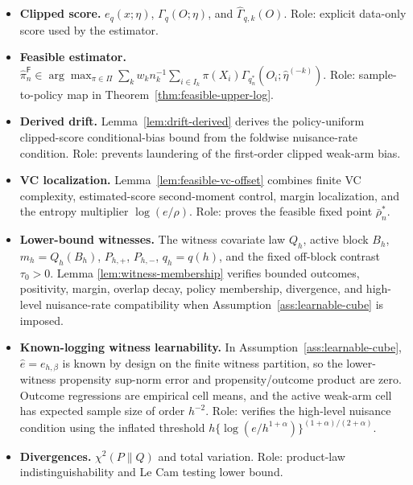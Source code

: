 \documentclass[11pt]{article}
\theoremstyle{definition}
\theoremstyle{plain}
\theoremstyle{remark}
\begin{document}
\begin{itemize}[leftmargin=*]
\(h_n^*=n^{-1/D_{\alpha,\gamma}}\),
\(q_n^*=q(h_n^*)\),
\(r_*(\alpha,\gamma)=(1+\alpha)/D_{\alpha,\gamma}\),
\(L_n^*=\log\{e/(h_n^*)^{1+\alpha}\), and
\(\bar\rho_n^*=(h_n^*)^{1+\alpha}(L_n^*)^{(1+\alpha)/(2+\alpha)}\).
Role: lower-bound calibration and finite-VC feasible upper-bound calibration.
\item \textbf{Clipped score.}  \(e_q(x;\eta)\), \(\Gamma_q(O;\eta)\), and
\(\widehat\Gamma_{q,k}(O)\).  Role: explicit data-only score used by the
estimator.
\item \textbf{Feasible estimator.}
\(\widehat\pi_n^{\mathsf F}\in\arg\max_{\pi\in\Pi}\sum_k w_k n_k^{-1}
\sum_{i\in I_k}\pi(X_i)\Gamma_{q_n^*}(O_i;\widehat\eta^{(-k)})\).  Role:
sample-to-policy map in Theorem~\ref{thm:feasible-upper-log}.
\item \textbf{Derived drift.}  Lemma~\ref{lem:drift-derived} derives the
policy-uniform clipped-score conditional-bias bound from the foldwise
nuisance-rate condition.  Role: prevents laundering of the first-order
clipped weak-arm bias.
\item \textbf{VC localization.}  Lemma~\ref{lem:feasible-vc-offset} combines
finite VC complexity, estimated-score second-moment control, margin
localization, and the entropy multiplier \(\log(e/\rho)\).  Role: proves the
feasible fixed point \(\bar\rho_n^*\).
\item \textbf{Lower-bound witnesses.}  The witness covariate law \(Q_h\),
active block \(B_h\), \(m_h=Q_h(B_h)\), \(P_{h,+}\), \(P_{h,-}\),
\(q_h=q(h)\), and the fixed off-block contrast \(\tau_0>0\).  Lemma
\ref{lem:witness-membership} verifies bounded outcomes, positivity, margin,
overlap decay, policy membership, divergence, and high-level nuisance-rate
compatibility when Assumption~\ref{ass:learnable-cube} is imposed.
\item \textbf{Known-logging witness learnability.}  In
Assumption~\ref{ass:learnable-cube}, \(\widehat e=e_{h,\beta}\) is known by
design on the finite witness partition, so the lower-witness propensity
sup-norm error and propensity/outcome product are zero.  Outcome regressions
are empirical cell means, and the active weak-arm cell has expected sample
size of order \(h^{-2}\).  Role: verifies the high-level nuisance condition
using the inflated threshold \(h\{\log(e/h^{1+\alpha})\}^{(1+\alpha)/(2+\alpha)}\).
\item \textbf{Divergences.}  \(\chi^2(P\|Q)\) and total variation.  Role:
product-law indistinguishability and Le Cam testing lower bound.
\end{itemize}
\end{document}
